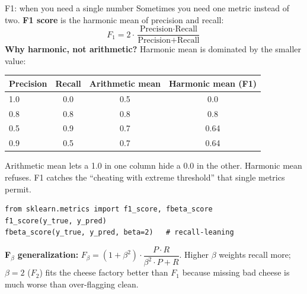 \documentclass[aspectratio=169]{beamer}
\begin{document}
\begin{frame}[fragile]{F1: when you need a single number}
  Sometimes you need one metric instead of two. \textbf{F1 score} is the harmonic mean of precision and recall:
  \[
    F_1 = 2 \cdot \frac{\text{Precision} \cdot \text{Recall}}{\text{Precision} + \text{Recall}}
  \]
  \vfill
  \textbf{Why harmonic, not arithmetic?} Harmonic mean is dominated by the smaller value:
  \begin{center}\small
    \begin{tabular}{lccc}
      Precision & Recall & Arithmetic mean & Harmonic mean (F1) \\ \hline
      1.0 & 0.0 & 0.5 & 0.0 \\
      0.8 & 0.8 & 0.8 & 0.8 \\
      0.5 & 0.9 & 0.7 & 0.64 \\
      0.9 & 0.5 & 0.7 & 0.64
    \end{tabular}
  \end{center}
  \vfill
  Arithmetic mean lets a 1.0 in one column hide a 0.0 in the other. Harmonic mean refuses. F1 catches the ``cheating with extreme threshold'' that single metrics permit.
  \vfill
{\lstset{basicstyle=\ttfamily\scriptsize}
\begin{lstlisting}
from sklearn.metrics import f1_score, fbeta_score
f1_score(y_true, y_pred)
fbeta_score(y_true, y_pred, beta=2)   # recall-leaning
\end{lstlisting}}
  \vfill
  \scriptsize \textbf{F$_\beta$ generalization:} $F_\beta = (1 + \beta^2) \cdot \dfrac{P \cdot R}{\beta^2 \cdot P + R}$. Higher $\beta$ weights recall more; $\beta = 2$ ($F_2$) fits the cheese factory better than $F_1$ because missing bad cheese is much worse than over-flagging clean.
\end{frame}
\end{document}
